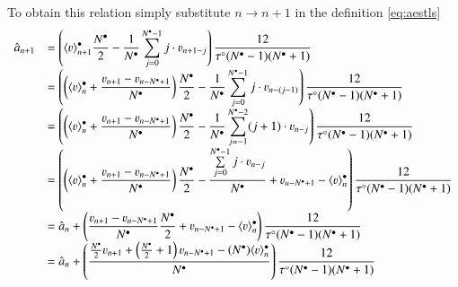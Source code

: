 To obtain this relation simply substitute $n\rightarrow n+1$ in the definition \ref{eq:aestls}
\begin{equation}
\begin{array}{ll}
{\displaystyle \hat{a}_{n+1}} &{\displaystyle = \left( \langle \varv \rangle^\bullet_{n+1} \frac{N^\bullet}{2} -\frac{1}{N^\bullet}\sum\limits_{j=0}^{N^\bullet-1} j\cdot \varv_{n+1-j}\right) \frac {12}{\tau^\circ (N^\bullet-1)(N^\bullet+1)}} \\ 
&{\displaystyle = \left(\left( \langle \varv \rangle^\bullet_{n}+\frac{ \varv_{n+1}-\varv_{n-N^\bullet+1}}{N^\bullet} \right)\frac{N^\bullet}{2} -\frac{1}{N^\bullet}\sum\limits_{j=0}^{N^\bullet-1} j\cdot \varv_{n-(j-1)}\right) \frac {12}{\tau^\circ (N^\bullet-1)(N^\bullet+1)}} \\
&{\displaystyle = \left(\left( \langle \varv \rangle^\bullet_{n}+\frac{ \varv_{n+1}-\varv_{n-N^\bullet+1}}{N^\bullet} \right)\frac{N^\bullet}{2} -\frac{1}{N^\bullet}\sum\limits_{j=-1}^{N^\bullet-2} (j+1)\cdot \varv_{n-j}\right) \frac {12}{\tau^\circ (N^\bullet-1)(N^\bullet+1)}} \\
&{\displaystyle = \left(\left( \langle \varv \rangle^\bullet_{n}+\frac{ \varv_{n+1}-\varv_{n-N^\bullet+1}}{N^\bullet} \right)\frac{N^\bullet}{2} -\frac{\sum\limits_{j=0}^{N^\bullet-1} j\cdot \varv_{n-j}}{N^\bullet}+\varv_{n-N^\bullet+1}-\langle \varv\rangle^\bullet_n \right) \frac {12}{\tau^\circ (N^\bullet-1)(N^\bullet+1)}} \\
&{\displaystyle = \hat{a}_n+ \left( \frac{ \varv_{n+1}-\varv_{n-N^\bullet+1}}{N^\bullet} \frac{N^\bullet}{2} +\varv_{n-N^\bullet+1}-\langle \varv\rangle^\bullet_n \right) \frac {12}{\tau^\circ (N^\bullet-1)(N^\bullet+1)}} \\
&{\displaystyle = \hat{a}_n + \left( \frac{ \frac{N^\bullet}{2}\varv_{n+1}+\left(\frac{N^\bullet}{2}+1\right)\varv_{n-N^\bullet+1}-(N^\bullet)\langle \varv\rangle^\bullet_n}{N^\bullet} \right) \frac {12}{\tau^\circ (N^\bullet-1)(N^\bullet+1)}} \\
\end{array}
\end{equation}



